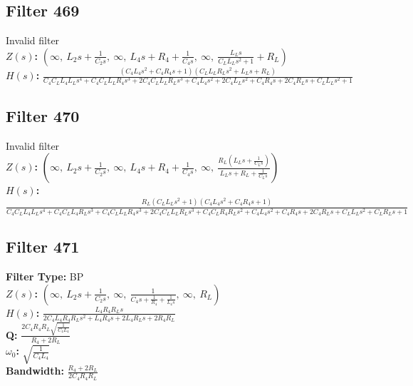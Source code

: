 \documentclass{article}
\begin{document}
\subsection*{Filter 469}
Invalid filter \\ 
\textbf{$Z(s)$:} $\left( \infty, \  L_{2} s + \frac{1}{C_{2} s}, \  \infty, \  L_{4} s + R_{4} + \frac{1}{C_{4} s}, \  \infty, \  \frac{L_{L} s}{C_{L} L_{L} s^{2} + 1} + R_{L}\right)$ \\ 
\textbf{$H(s)$:} $\frac{\left(C_{4} L_{4} s^{2} + C_{4} R_{4} s + 1\right) \left(C_{L} L_{L} R_{L} s^{2} + L_{L} s + R_{L}\right)}{C_{4} C_{L} L_{4} L_{L} s^{4} + C_{4} C_{L} L_{L} R_{4} s^{3} + 2 C_{4} C_{L} L_{L} R_{L} s^{3} + C_{4} L_{4} s^{2} + 2 C_{4} L_{L} s^{2} + C_{4} R_{4} s + 2 C_{4} R_{L} s + C_{L} L_{L} s^{2} + 1}$ \\ 
\subsection*{Filter 470}
Invalid filter \\ 
\textbf{$Z(s)$:} $\left( \infty, \  L_{2} s + \frac{1}{C_{2} s}, \  \infty, \  L_{4} s + R_{4} + \frac{1}{C_{4} s}, \  \infty, \  \frac{R_{L} \left(L_{L} s + \frac{1}{C_{L} s}\right)}{L_{L} s + R_{L} + \frac{1}{C_{L} s}}\right)$ \\ 
\textbf{$H(s)$:} $\frac{R_{L} \left(C_{L} L_{L} s^{2} + 1\right) \left(C_{4} L_{4} s^{2} + C_{4} R_{4} s + 1\right)}{C_{4} C_{L} L_{4} L_{L} s^{4} + C_{4} C_{L} L_{4} R_{L} s^{3} + C_{4} C_{L} L_{L} R_{4} s^{3} + 2 C_{4} C_{L} L_{L} R_{L} s^{3} + C_{4} C_{L} R_{4} R_{L} s^{2} + C_{4} L_{4} s^{2} + C_{4} R_{4} s + 2 C_{4} R_{L} s + C_{L} L_{L} s^{2} + C_{L} R_{L} s + 1}$ \\ 
\subsection*{Filter 471}
\textbf{Filter Type:} BP \\ 
\textbf{$Z(s)$:} $\left( \infty, \  L_{2} s + \frac{1}{C_{2} s}, \  \infty, \  \frac{1}{C_{4} s + \frac{1}{R_{4}} + \frac{1}{L_{4} s}}, \  \infty, \  R_{L}\right)$ \\ 
\textbf{$H(s)$:} $\frac{L_{4} R_{4} R_{L} s}{2 C_{4} L_{4} R_{4} R_{L} s^{2} + L_{4} R_{4} s + 2 L_{4} R_{L} s + 2 R_{4} R_{L}}$ \\ 
\textbf{Q:} $\frac{2 C_{4} R_{4} R_{L} \sqrt{\frac{1}{C_{4} L_{4}}}}{R_{4} + 2 R_{L}}$ \\ 
\textbf{$\omega_0$:} $\sqrt{\frac{1}{C_{4} L_{4}}}$ \\ 
\textbf{Bandwidth:} $\frac{R_{4} + 2 R_{L}}{2 C_{4} R_{4} R_{L}}$ \\ 
\end{document}
